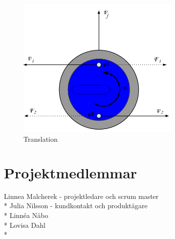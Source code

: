 \documentclass[11pt]{article} %
\begin{document}
\begin{figure}[ht!]
\centering
\includegraphics[width=80mm]{Translation.png}
\caption{Translation}
\label{fig:Translation}
\label{overflow}
\end{figure}


\pagebreak


\section{Projektmedlemmar}

Linnea Malcherek - projektledare och scrum master\\*
Julia Nilsson - kundkontakt och produktägare\\*
Linnéa Nåbo \\*
Lovisa Dahl\\*
\end{document}
